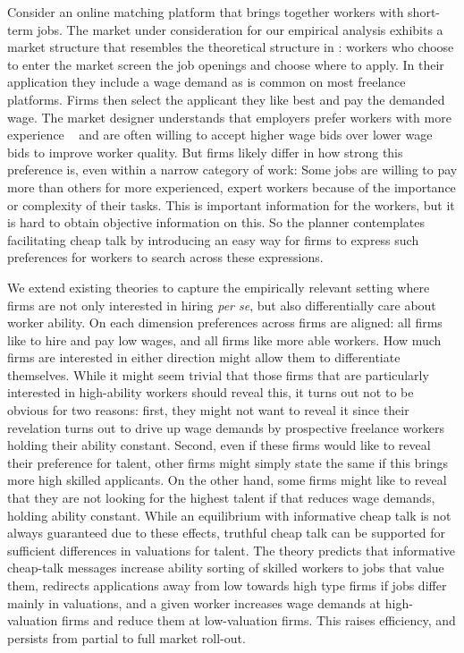 \documentclass[12pt]{article}
\begin{document}
 Consider an online matching platform that brings together workers with short-term jobs. The market under consideration for our empirical analysis \citep{Horton2010} exhibits a market structure that resembles the theoretical structure in \cite{kimKircher2015}: workers who choose to enter the market screen the job openings and choose where to apply. In their application they include a wage demand as is common on most freelance platforms. Firms then select the applicant they like best and pay the demanded wage. The market designer understands that employers prefer workers with more experience ~\citep{pallais2010inefficient, stanton2011landing} and are often willing to accept higher wage bids over lower wage bids \citep{hortonVasserman2020} to improve worker quality. But firms likely differ in how strong this preference is, even within a narrow category of work:
Some jobs are willing to pay more than others for more experienced, expert workers because of the importance or complexity of their tasks. This is important information for the workers, but it is hard to obtain objective information on this. So the planner contemplates facilitating cheap talk by introducing an easy way for firms to express such preferences for workers to search across these expressions. 
 
 We extend existing theories to capture the empirically relevant setting where firms are not only interested in hiring \emph{per se}, but also differentially care about worker ability. On each dimension preferences across firms are aligned: all firms like to hire and pay low wages, and all firms like more able workers. How much firms are interested in either direction might allow them to differentiate themselves. While it might seem trivial that those firms that are particularly interested in high-ability workers should reveal this, it turns out not to be obvious for two reasons: first, they might not want to reveal it since their revelation turns out to drive up wage demands by prospective freelance workers holding their ability constant. Second, even if these firms would like to reveal their preference for talent, other firms might simply state the same if this brings more high skilled applicants. On the other hand, some firms might like to reveal that they are not looking for the highest talent if that reduces wage demands, holding ability constant. While an equilibrium with informative cheap talk is not always guaranteed due to these effects, truthful cheap talk can be supported for sufficient differences in valuations for talent. The theory predicts that informative cheap-talk messages increase ability sorting of skilled workers to jobs that value them, redirects applications away from low towards high type firms if jobs differ mainly in valuations, and a given worker increases wage demands at high-valuation firms and reduce them at low-valuation firms. This raises efficiency, and persists from partial to full market roll-out. 
\end{document}
